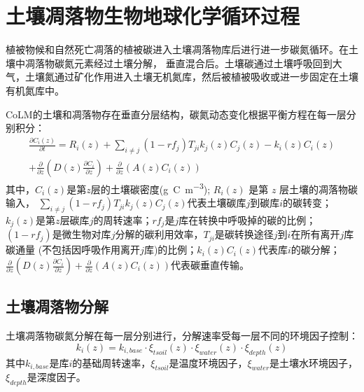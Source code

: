\chapter{土壤凋落物生物地球化学循环过程}\label{土壤凋落物生物地球化学循环过程}

植被物候和自然死亡凋落的植被碳进入土壤凋落物库后进行进一步碳氮循环。在土壤中凋落物碳氮元素经过土壤分解，
垂直混合后。土壤碳通过土壤呼吸回到大气，土壤氮通过矿化作用进入土壤无机氮库，然后被植被吸收或进一步固定在土壤有机氮库中。

CoLM的土壤和凋落物存在垂直分层结构，碳氮动态变化根据平衡方程在每一层分别积分：
\begin{equation}
\begin{array}{r}\frac{\partial C_{i}(z)}{\partial t}=R_{i}(z)+\sum_{i \neq j}\left(1-r f_{j}\right) T_{j i} k_{j}(z) C_{j}(z)-k_{i}(z) C_{i}(z) \\ +\frac{\partial}{\partial z}\left(D(z) \frac{\partial C_{i}}{\partial z}\right)+\frac{\partial}{\partial z}\left(A(z) C_{i}(z)\right)\end{array}
\end{equation}
其中，$C_i\left(z\right)$是第$z$层的土壤碳密度(\unit{g.C.m^{-3}}); $R_i (z)$ 是第 $z$ 层土壤的凋落物碳输入，
$\sum_{i\neq j}{\left(1-{rf}_j\right)T_{ji}k_j\left(z\right)C_j\left(z\right)}$代表土壤碳库$j$到碳库$i$的碳转变；
$k_j\left(z\right)$是第$z$层碳库$j$的周转速率；${rf}_j$是$j$库在转换中呼吸掉的碳的比例；
$\left(1-{rf}_j\right)$是微生物对库$j$分解的碳利用效率，$T_{ji}$是碳转换途径$j$到$i$在所有离开$j$库碳通量
(不包括因呼吸作用离开$j$库)的比例；$k_i\left(z\right)C_i\left(z\right)$代表库$i$的碳分解；
$\frac{\partial}{\partial z}\left(D\left(z\right)\frac{\partial C_i}{\partial z}\right)+\frac{\partial}{\partial z}\left(A\left(z\right)C_i\left(z\right)\right)$代表碳垂直传输。


\section{土壤凋落物分解}\label{土壤凋落物分解}
土壤凋落物碳氮分解在每一层分别进行，分解速率受每一层不同的环境因子控制：
\begin{equation}
k_{i}(z)=k_{i,base} \cdot \xi_{tsoil}(z) \cdot \xi_{water}(z) \cdot \xi_{depth}(z)
\end{equation}
其中$k_{i,base}$是库$i$的基础周转速率，$\xi_{tsoil}$是温度环境因子，$\xi_{water}$是土壤水环境因子，$\xi_{depth}$是深度因子。


